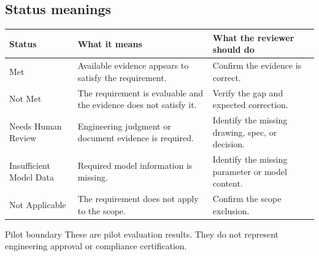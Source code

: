 \subsection*{Status meanings}
\begin{longtable}{@{}p{}p{}p{}@{}}
\toprule
\textbf{Status} & \textbf{What it means} & \textbf{What the reviewer should do} \\
\midrule
Met & Available evidence appears to satisfy the requirement. & Confirm the evidence is correct. \\
Not Met & The requirement is evaluable and the evidence does not satisfy it. & Verify the gap and expected correction. \\
Needs Human Review & Engineering judgment or document evidence is required. & Identify the missing drawing, spec, or decision. \\
Insufficient Model Data & Required model information is missing. & Identify the missing parameter or model content. \\
Not Applicable & The requirement does not apply to the scope. & Confirm the scope exclusion. \\
\bottomrule
\end{longtable}

\begin{warnbox}{Pilot boundary}
These are pilot evaluation results. They do not represent engineering approval or compliance certification.
\end{warnbox}
\clearpage
